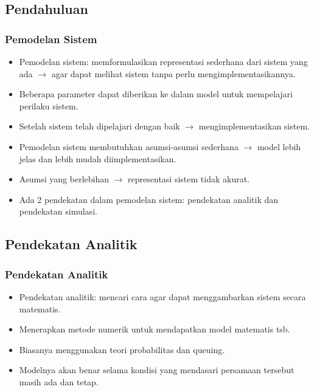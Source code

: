 \documentclass[pdflatex,compress]{beamer}
\begin{document}
\subsection{Pendahuluan}
\begin{frame}
	\frametitle{Pemodelan Sistem}
	\begin{itemize}
		\item Pemodelan sistem: memformulasikan representasi sederhana dari sistem yang ada $\rightarrow$ agar dapat melihat sistem tanpa perlu mengimplementasikannya.
		\item Beberapa parameter dapat diberikan ke dalam model untuk mempelajari perilaku sistem.
		\item Setelah sistem telah dipelajari dengan baik $\rightarrow$ mengimplementasikan sistem.
		\item Pemodelan sistem membutuhkan asumsi-asumsi sederhana $\rightarrow$ model lebih jelas dan lebih mudah diimplementasikan.
		\item Asumsi yang berlebihan $\rightarrow$ representasi sistem tidak akurat.
		\item Ada 2 pendekatan dalam pemodelan sistem: pendekatan analitik dan pendekatan simulasi.
	\end{itemize}
\end{frame}

\subsection{Pendekatan Analitik}
\begin{frame}
	\frametitle{Pendekatan Analitik}
	\begin{itemize}
		\item Pendekatan analitik: mencari cara agar dapat menggambarkan sistem secara matematis.
		\item Menerapkan metode numerik untuk mendapatkan model matematis tsb.
		\item Biasanya menggunakan teori probabilitas dan queuing.
		\item Modelnya akan benar selama kondisi yang mendasari persamaan tersebut masih ada dan tetap.
	\end{itemize}
\end{frame}
\end{document}
